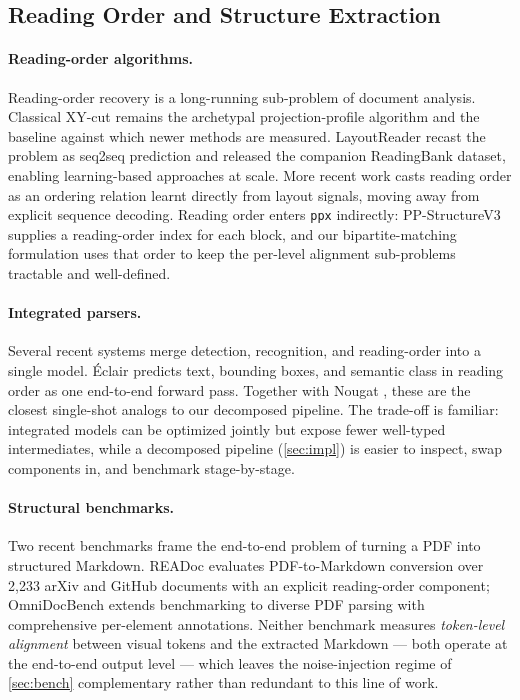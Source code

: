 \documentclass{article}
\theoremstyle{definition}
\begin{document}
\subsection{Reading Order and Structure Extraction}

\paragraph{Reading-order algorithms.}  Reading-order recovery is a
long-running sub-problem of document analysis.  Classical XY-cut
\cite{meunier2005xycut} remains the archetypal
projection-profile algorithm and the baseline against which newer
methods are measured.  LayoutReader \cite{wang2021layoutreader}
recast the problem as seq2seq prediction and released the companion
ReadingBank dataset, enabling learning-based approaches at scale.
More recent work \cite{zhang2024modeling} casts reading order as an
ordering relation learnt directly from layout signals, moving away
from explicit sequence decoding.  Reading order enters \texttt{ppx}
indirectly: PP-StructureV3 supplies a reading-order index for each
block, and our bipartite-matching formulation uses that order to
keep the per-level alignment sub-problems tractable and
well-defined.

\paragraph{Integrated parsers.}  Several recent systems merge
detection, recognition, and reading-order into a single model.
      {\'E}clair \cite{eclair2025extracting} predicts text, bounding
boxes, and semantic class in reading order as one end-to-end
forward pass.  Together with Nougat \cite{blecher2023nougat}, these
are the closest single-shot analogs to our decomposed pipeline.
The trade-off is familiar: integrated models can be optimized
jointly but expose fewer well-typed intermediates, while a
decomposed pipeline (\cref{sec:impl}) is easier to inspect, swap
components in, and benchmark stage-by-stage.

\paragraph{Structural benchmarks.}  Two recent benchmarks frame the
end-to-end problem of turning a PDF into structured Markdown.
READoc \cite{li2024readoc} evaluates PDF-to-Markdown conversion
over 2{,}233 arXiv and GitHub documents with an explicit
reading-order component; OmniDocBench
\cite{ouyang2025omnidocbench} extends benchmarking to diverse PDF
parsing with comprehensive per-element annotations.  Neither
benchmark measures \emph{token-level alignment} between visual
tokens and the extracted Markdown --- both operate at the
end-to-end output level --- which leaves the noise-injection regime
of \cref{sec:bench} complementary rather than redundant to this line
of work.
\end{document}
